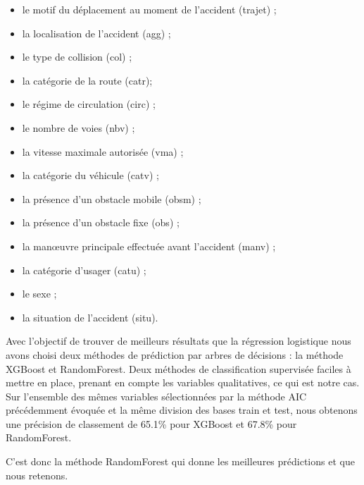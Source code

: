 \documentclass[french,]{tp}
\providecommand{\tightlist}{%
  \setlength{\itemsep}{0pt}\setlength{\parskip}{0pt}}
\begin{document}
\begin{itemize}
\tightlist
\item
  le motif du déplacement au moment de l'accident (trajet) ;\\
\item
  la localisation de l'accident (agg) ;\\
\item
  le type de collision (col) ;\\
\item
  la catégorie de la route (catr);\\
\item
  le régime de circulation (circ) ;\\
\item
  le nombre de voies (nbv) ;\\
\item
  la vitesse maximale autorisée (vma) ;\\
\item
  la catégorie du véhicule (catv) ;\\
\item
  la présence d'un obstacle mobile (obsm) ;\\
\item
  la présence d'un obstacle fixe (obs) ;\\
\item
  la manœuvre principale effectuée avant l'accident (manv) ;\\
\item
  la catégorie d'usager (catu) ;\\
\item
  le sexe ;\\
\item
  la situation de l'accident (situ).
\end{itemize}

Avec l'objectif de trouver de meilleurs résultats que la régression logistique nous avons choisi deux méthodes de prédiction par arbres de décisions : la méthode XGBoost et RandomForest. Deux méthodes de classification supervisée faciles à mettre en place, prenant en compte les variables qualitatives, ce qui est notre cas. Sur l'ensemble des mêmes variables sélectionnées par la méthode AIC précédemment évoquée et la même division des bases train et test, nous obtenons une précision de classement de 65.1\% pour XGBoost et 67.8\% pour RandomForest.

C'est donc la méthode RandomForest qui donne les meilleures prédictions et que nous retenons.
\end{document}
